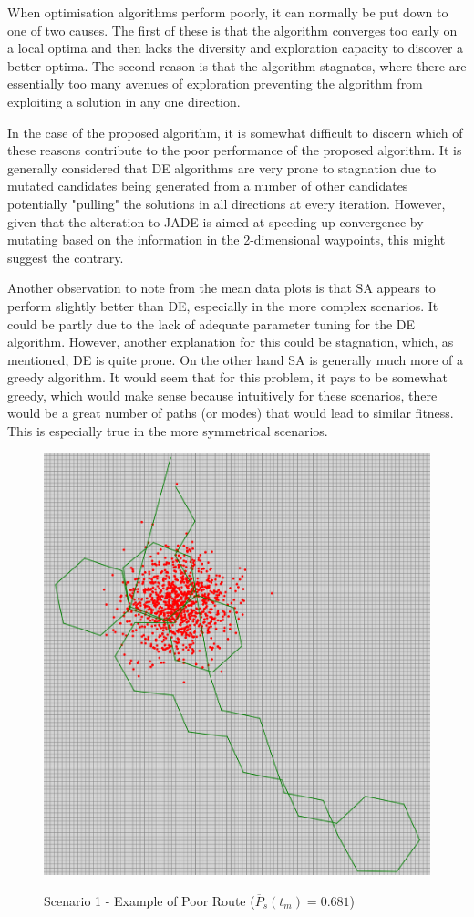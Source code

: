 \documentclass[10pt,a4paper, oneside, conference]{IEEEtran}
\begin{document}
When optimisation algorithms perform poorly, it can normally be put down to one of two causes. The first of these is that the algorithm converges too early on a local optima and then lacks the diversity and exploration capacity to discover a better optima.
The second reason is that the algorithm stagnates, where there are essentially too many avenues of exploration preventing the algorithm from exploiting a solution in any one direction.

In the case of the proposed algorithm, it is somewhat difficult to discern which of these reasons contribute to the poor performance of the proposed algorithm.
It is generally considered that DE algorithms are very prone to stagnation due to mutated candidates being generated from a number of other candidates potentially "pulling" the solutions in all directions at every iteration.
However, given that the alteration to JADE is aimed at speeding up convergence by mutating based on the information in the 2-dimensional waypoints, this might suggest the contrary.

Another observation to note from the mean data plots is that SA appears to perform slightly better than DE, especially in the more complex scenarios.
It could be partly due to the lack of adequate parameter tuning for the DE algorithm.
However, another explanation for this could be stagnation, which, as mentioned, DE is quite prone. 
On the other hand SA is generally much more of a greedy algorithm.
It would seem that for this problem, it pays to be somewhat greedy, which would make sense because intuitively for these scenarios, there would be a great number of paths (or modes) that would lead to similar fitness. This is especially true in the more symmetrical scenarios.



\begin{figure}[H]
	\caption{Scenario 1 - Example of Poor Route ($\overline{P}_s(t_m)=0.681$)}
	\includegraphics[width=0.7\linewidth]{poorRouteScenario1.png}
	\centering
	\label{fig:scenario1Poor}	
	\end{figure}
\end{document}
